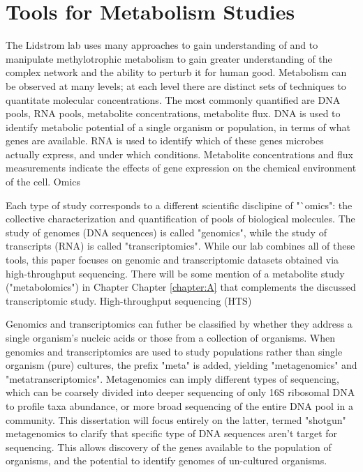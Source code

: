 \section{Tools for Metabolism Studies}
The Lidstrom lab uses many approaches to gain understanding of and to manipulate methylotrophic metabolism to gain greater understanding of the complex network and the ability to perturb it for human good.
Metabolism can be observed at many levels; at each level there are distinct sets of techniques to quantitate molecular concentrations.
The most commonly quantified are DNA pools, RNA pools, metabolite concentrations, metabolite flux.
DNA is used to identify metabolic potential of a single organism or population, in terms of what genes are available.
RNA is used to identify which of these genes microbes actually express, and under which conditions.
Metabolite concentrations and flux measurements indicate the effects of gene expression on the chemical environment of the cell.
Omics

Each type of study corresponds to a different scientific disclipine of "`omics": the collective characterization and quantification of pools of biological molecules.
The study of genomes (DNA sequences) is called "genomics", while the study of transcripts (RNA) is called "transcriptomics".
While our lab combines all of these tools, this paper focuses on genomic and transcriptomic datasets obtained via high-throughput sequencing.
There will be some mention of a metabolite study ("metabolomics") in Chapter Chapter \ref{chapter:A} that complements the discussed transcriptomic study.
High-throughput sequencing (HTS)

Genomics and transcriptomics can futher be classified by whether they address a single organism's nucleic acids or those from a collection of organisms.
When genomics and transcriptomics are used to study populations rather than single organism (pure) cultures, the prefix "meta" is added, yielding "metagenomics" and "metatranscriptomics".
Metagenomics can imply different types of sequencing, which can be coarsely divided into deeper sequencing of only 16S ribosomal DNA to profile taxa abundance, or more broad sequencing of the entire DNA pool in a community.
This dissertation will focus entirely on the latter, termed "shotgun" metagenomics to clarify that specific type of DNA sequences aren't target for sequencing.
This allows discovery of the genes available to the population of organisms, and the potential to identify genomes of un-cultured organisms.

